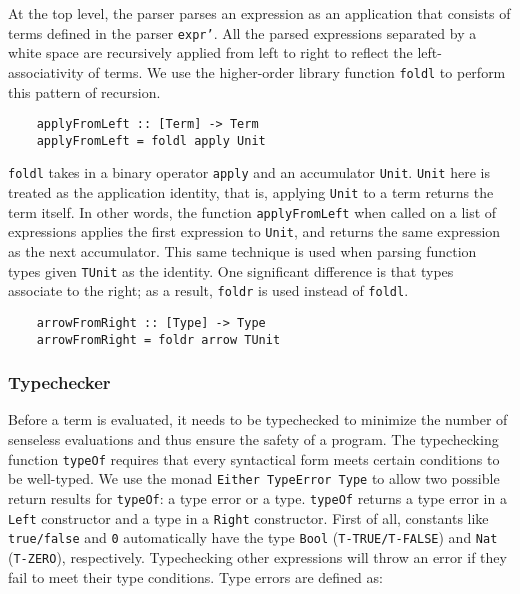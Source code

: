 \documentclass[fleqn, 11pt]{article}
\begin{document}
At the top level, the parser parses an expression as an application that consists of terms defined in the parser \texttt{expr'}. 
All the parsed expressions separated by a white space are recursively applied from left to right to reflect the left-associativity 
of terms. We use the higher-order library function \texttt{foldl} to perform this pattern of recursion.

\begin{Verbatim}
    applyFromLeft :: [Term] -> Term
    applyFromLeft = foldl apply Unit
\end{Verbatim}

\texttt{foldl} takes in a binary operator \texttt{apply} and an accumulator \texttt{Unit}. \texttt{Unit} here is treated as the 
application identity, that is, applying \texttt{Unit} to a term returns the term itself. In other words, the function \texttt{applyFromLeft} 
when called on a list of expressions applies the first expression to \texttt{Unit}, and returns the same expression as the next 
accumulator. This same technique is used when parsing function types given \texttt{TUnit} as the identity. One significant difference is 
that types associate to the right; as a result, \texttt{foldr} is used instead of \texttt{foldl}.

\begin{Verbatim}
    arrowFromRight :: [Type] -> Type
    arrowFromRight = foldr arrow TUnit
\end{Verbatim}

\subsubsection{Typechecker}

Before a term is evaluated, it needs to be typechecked to minimize the number of senseless evaluations and thus ensure the safety of a 
program. The typechecking function \texttt{typeOf} requires that every syntactical form meets certain conditions to be well-typed. 
We use the monad \texttt{Either TypeError Type} to allow two possible return results for \texttt{typeOf}: a type error or a type. 
\texttt{typeOf} returns a type error in a \texttt{Left} constructor and a type in a \texttt{Right} constructor. First of all, constants 
like \texttt{true/false} and \texttt{0} automatically have the type \texttt{Bool} (\texttt{T-TRUE/T-FALSE}) and \texttt{Nat} (\texttt{T-ZERO}), 
respectively. Typechecking other expressions will throw an error if they fail to meet their type conditions. Type errors are defined as:
\end{document}
